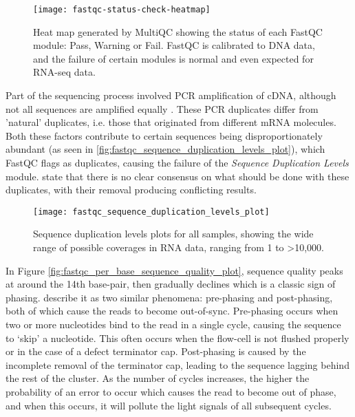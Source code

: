 \newpage
\begin{figure}[!h]
    \centering
    \texttt{[image: fastqc-status-check-heatmap]}
    \caption[Heat map showing the status of each FastQC module]{Heat map generated by MultiQC showing the status of each FastQC module: Pass, Warning or Fail. FastQC is calibrated to DNA data, and the failure of certain modules is normal and even expected for RNA-seq data.} 
    \label{fig:fastqc-status-check-heatmap}
\end{figure}

\newpage
Part of the sequencing process involved PCR amplification of cDNA, although not all sequences are amplified equally \citep{kozarewa2009amplification}. These PCR duplicates differ from 'natural' duplicates, i.e. those that originated from different mRNA molecules. Both these factors contribute to certain sequences being disproportionately abundant (as seen in \autoref{fig:fastqc_sequence_duplication_levels_plot}), which FastQC flags as duplicates, causing the failure of the \textit{Sequence Duplication Levels} module. \cite{parekh2016impact} state that there is no clear consensus on what should be done with these duplicates, with their removal producing conflicting results.

\begin{figure}[!h]
    \centering
    \texttt{[image: fastqc\_sequence\_duplication\_levels\_plot]}
    \caption[Sequence duplication levels plots for all samples]{Sequence duplication levels plots for all samples, showing the wide range of possible coverages in RNA data, ranging from 1 to >10,000.} 
    \label{fig:fastqc_sequence_duplication_levels_plot}
\end{figure}

\newpage
In Figure \ref{fig:fastqc_per_base_sequence_quality_plot}, sequence quality peaks at around the 14th base-pair, then gradually declines which is a classic sign of phasing. \cite{pfeiffer2018systematic} describe it as two similar phenomena: pre-phasing and post-phasing, both of which cause the reads to become out-of-sync. Pre-phasing occurs when two or more nucleotides bind to the read in a single cycle, causing the sequence to ‘skip’ a nucleotide. This often occurs when the flow-cell is not flushed properly or in the case of a defect terminator cap. Post-phasing is caused by the incomplete removal of the terminator cap, leading to the sequence lagging behind the rest of the cluster. As the number of cycles increases, the higher the probability of an error to occur which causes the read to become out of phase, and when this occurs, it will pollute the light signals of all subsequent cycles.


